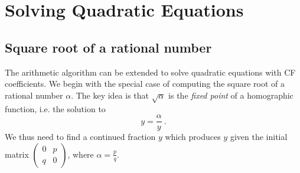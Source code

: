 \documentclass[11pt, oneside]{amsart}   	%
\begin{document}
\section{Solving Quadratic Equations}
\subsection{Square root of a rational number}
The arithmetic algorithm can be extended to solve quadratic equations with CF coefficients.
We begin with the special case of computing the square root of a rational number $\alpha$. 
The key idea is that $\sqrt{\alpha}$ is the \emph{fixed point} of a homographic function, i.e. the solution to
\[
y = \frac{\alpha}{y}\ .
\]
We thus need to find a continued fraction $y$ which produces $y$ given the initial matrix
$\left(\begin{smallmatrix}
0 & p \\
q & 0
\end{smallmatrix}\right)$, where $\alpha = \frac{p}{q}$.
\end{document}
